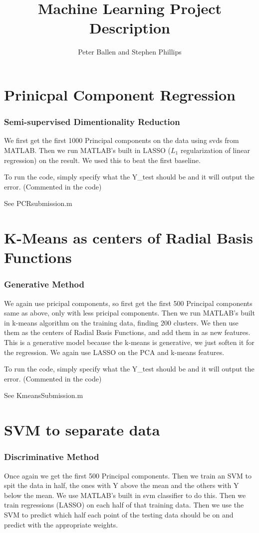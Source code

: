 \documentclass[a4paper,10pt]{article}
\title{Machine Learning Project Description}
\author{Peter Ballen and Stephen Phillips}
\begin{document}
\maketitle

\section{Prinicpal Component Regression}
\subsubsection*{Semi-supervised Dimentionality Reduction}
We first get the first 1000 Principal components on the data using svds from MATLAB.
Then we run MATLAB's built in LASSO ($L_1$ regularization of linear regression) on the result. We used this to beat the first baseline. 

To run the code, simply specify what the Y\_test should be and it will output the error. (Commented in the code)

See PCRsubmission.m

\section{K-Means as centers of Radial Basis Functions}
\subsubsection*{Generative Method}
We again use pricipal components, so first get the first 500 Principal components same as above, only with less pricipal components.
Then we run MATLAB's built in k-means algorithm on the training data, finding 200 clusters. We then use them as the centers of
Radial Basis Functions, and add them in as new features. This is a generative model because the k-means is generative, we just
soften it for the regression. We again use LASSO on the PCA and k-means features.

To run the code, simply specify what the Y\_test should be and it will output the error. (Commented in the code)

See KmeansSubmission.m

\section{SVM to separate data}
\subsubsection*{Discriminative Method}
Once again we get the first 500 Principal components. Then we train an SVM to spit the data in half, the ones with Y above the mean and the
others with Y below the mean. We use MATLAB's built in svm classifier to do this. Then we train regressions (LASSO) on each half of that training data.
Then we use the SVM to predict which half each point of the testing data should be on and predict with the appropriate weights. 
\end{document}
